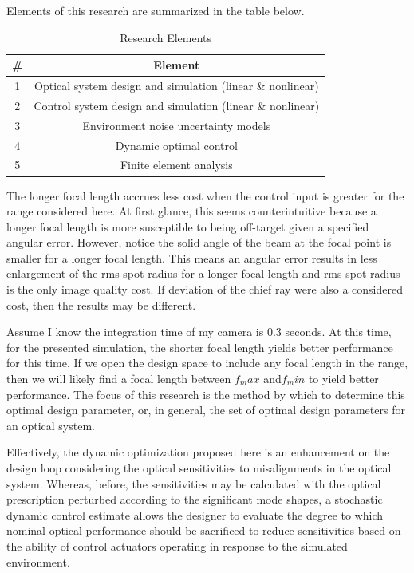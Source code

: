 \documentclass{aiaa-tc}
\begin{document}
Elements of this research are summarized in the table below.

\begin{table}
  \centering
  \caption{Research Elements}
  \label{t:researchElements}
  \begin{tabular}{cc}
       \# & Element \\\hline
        1 &  Optical system design and simulation (linear \& nonlinear) \\
        2 &  Control system design and simulation (linear \& nonlinear) \\
        3 &  Environment noise uncertainty models \\
        4 &  Dynamic optimal control \\
        5 &  Finite element analysis 
  \end{tabular}
\end{table}

The longer focal length accrues less cost when the control input is greater for the range considered here. At first glance, this seems counterintuitive because a longer focal length is more susceptible to being off-target given a specified angular error. However, notice the solid angle of the beam at the focal point is smaller for a longer focal length. This means an angular error results in less enlargement of the rms spot radius for a longer focal length and rms spot radius is the only image quality cost. If deviation of the chief ray were also a considered cost, then the results may be different.

Assume I know the integration time of my camera is 0.3 seconds. At this time, for the presented simulation, the shorter focal length yields better performance for this time. If we open the design space to include any focal length in the range, then we will likely find a focal length between $f_max$ and$f_min$ to yield better performance. The focus of this research is the method by which to determine this optimal design parameter, or, in general, the set of optimal design parameters for an optical system.

Effectively, the dynamic optimization proposed here is an enhancement on the design loop considering the optical sensitivities to misalignments in the optical system. Whereas, before, the sensitivities may be calculated with the optical prescription perturbed according to the significant mode shapes, a stochastic dynamic control estimate allows the designer to evaluate the degree to which nominal optical performance should be sacrificed to reduce sensitivities based on the ability of control actuators operating in response to the simulated environment.
\end{document}
